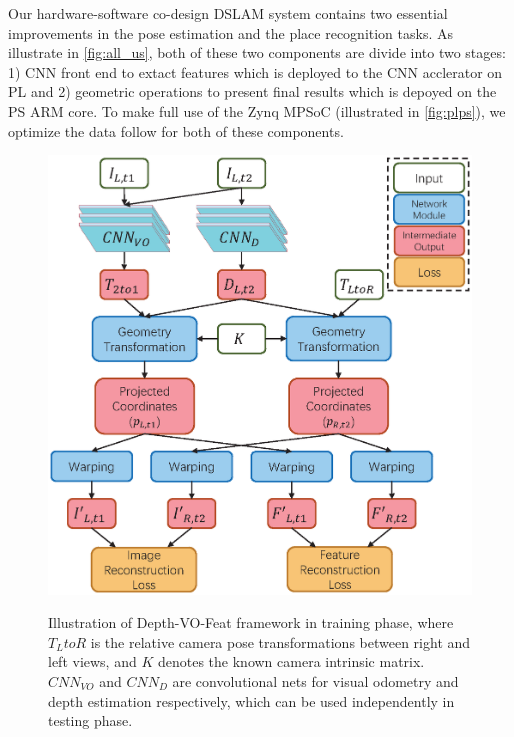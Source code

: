 \label{sec:hardsoft}
Our hardware-software co-design DSLAM system contains two essential improvements in the pose estimation and the place recognition tasks. As illustrate in \cref{fig:all_us}, both of these two components are divide into two stages: 1) CNN front end to extact features which is deployed to the CNN acclerator on PL and 2) geometric operations to present final results which is depoyed on the PS ARM core. To make full use of the Zynq MPSoC (illustrated in \cref{fig:plps}), we optimize the data follow for both of these components.

\begin{figure}[t]  
    \centering  
    {\includegraphics[width=0.95\linewidth]{fig/depth_vo_feat.eps}\label{fig:dvo}}
    \caption{Illustration of Depth-VO-Feat framework in training phase, where $T_LtoR$ is the relative camera pose transformations between right and left views, and $K$ denotes the known camera intrinsic matrix. $CNN_{VO}$ and $CNN_D$ are convolutional nets for visual odometry and depth estimation respectively, which can be used independently in testing phase. }
\end{figure}

